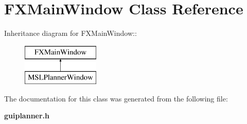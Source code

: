 \section{FXMain\-Window  Class Reference}
\label{class_FXMainWindow}
Inheritance diagram for FXMain\-Window::\begin{figure}[H]
\begin{center}
\leavevmode
\includegraphics[height=2cm]{class_FXMainWindow}
\end{center}
\end{figure}


The documentation for this class was generated from the following file:\begin{CompactItemize}
\item 
{\bf guiplanner.h}\end{CompactItemize}
